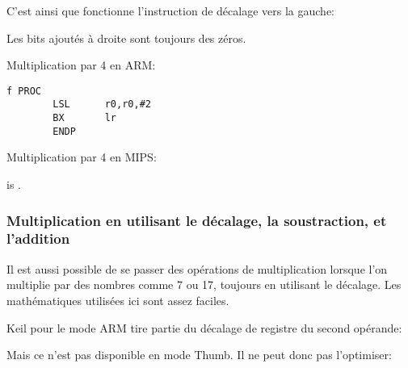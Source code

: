 C'est ainsi que fonctionne l'instruction de décalage vers la gauche:



Les bits ajoutés à droite sont toujours des zéros.

Multiplication par 4 en ARM:

\begin{lstlisting}[caption=\NonOptimizingKeilVI (\ARMMode),style=customasmARM]
f PROC
        LSL      r0,r0,#2
        BX       lr
        ENDP
\end{lstlisting}

Multiplication par 4 en MIPS:



 is .

\subsubsection{Multiplication en utilisant le décalage, la soustraction, et l'addition}
\label{multiplication_using_shifts_adds_subs}

Il est aussi possible de se passer des opérations de multiplication lorsque l'on
multiplie par des nombres comme 7 ou 17, toujours en utilisant le décalage.
Les mathématiques utilisées ici sont assez faciles.








Keil pour le mode ARM tire partie du décalage de registre du second opérande:



Mais ce n'est pas disponible en mode Thumb.
Il ne peut donc pas l'optimiser:



